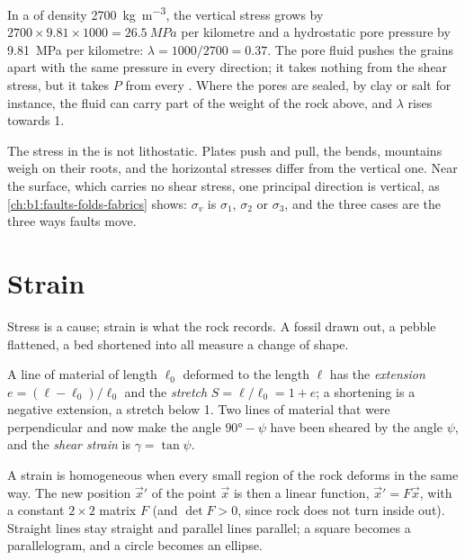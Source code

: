 In a  of density \qty{2700}{kg.m^{-3}}, the vertical stress grows by
$2700\times9.81\times1000 = \qty{26.5}{MPa}$ per kilometre and a hydrostatic
pore pressure by \qty{9.81}{MPa} per kilometre: $\lambda = 1000/2700 = 0.37$.
The pore fluid pushes the grains apart with the same pressure in every
direction; it takes nothing from the shear stress, but it takes $P$ from every
. Where the pores are sealed, by clay or salt for instance, the
fluid can carry part of the weight of the rock above, and $\lambda$ rises
towards 1.

The stress in the  is not lithostatic. Plates push and pull, the 
bends, mountains weigh on their roots, and the horizontal stresses differ from
the vertical one. Near the surface, which carries no shear stress, one
principal direction is vertical, as \cref{ch:b1:faults-folds-fabrics} shows:
$\sigma_v$ is $\sigma_1$, $\sigma_2$ or $\sigma_3$, and the three cases are
the three ways faults move.

\section{Strain}\label{sec:b1:stress-strain-rheology:strain}

Stress is a cause; strain is what the rock records. A fossil drawn out, a
pebble flattened, a bed shortened into  all measure a change of shape.

\begin{definition}\label{def:b1:stress-strain-rheology:strain}
A line of material of length $\ell_0$ deformed to the length $\ell$ has the
\emph{extension} $e = (\ell - \ell_0)/\ell_0$ and
the \emph{stretch} $S = \ell/\ell_0 = 1 + e$; a shortening is
a negative extension, a stretch below 1. Two lines of material that were
perpendicular and now make the angle $\ang{90} - \psi$ have been sheared by
the angle $\psi$, and the \emph{shear strain} is
$\gamma = \tan\psi$.
\end{definition}

A strain is homogeneous when every small region of the rock deforms in the
same way. The new position $\vec x'$ of the point $\vec x$ is then a linear
function, $\vec x' = F\vec x$, with a constant $2\times2$ matrix $F$ (and
$\det F > 0$, since rock does not turn inside out). Straight lines stay
straight and parallel lines parallel; a square becomes a parallelogram, and a
circle becomes an ellipse.

